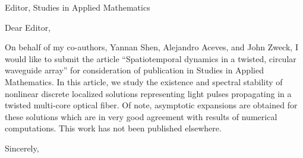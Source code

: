 \documentclass[11pt]{letter}
\begin{document}
\address{Ross Parker \\
Department of Mathematics \\
Southern Methodist University \\
Dallas, TX 75275 \\
\texttt{rhparker@smu.edu}}%
\signature{Ross Parker}
\begin{letter}{Editor, Studies in Applied Mathematics}

\opening{Dear Editor,}

On behalf of my co-authors, Yannan Shen, Alejandro Aceves, and John Zweck, I would like to submit the article ``Spatiotemporal dynamics in a twisted, circular waveguide array'' for consideration of publication in Studies in Applied Mathematics. In this article, we study the existence and spectral stability of nonlinear discrete localized solutions representing light pulses propagating in a twisted multi-core optical fiber. Of note, asymptotic expansions are obtained for these solutions which are in very good agreement with results of numerical computations. This work has not been published elsewhere.


\closing{Sincerely,}

\end{letter}
\end{document}
